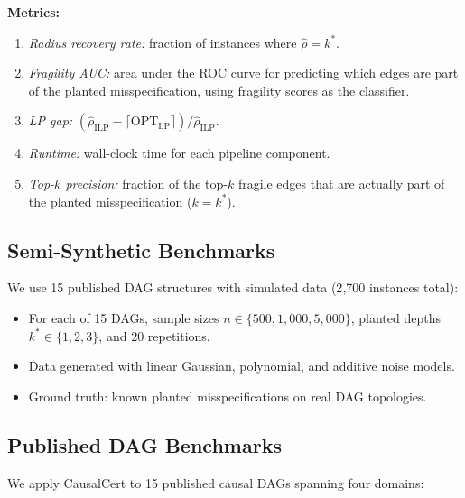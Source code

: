 \documentclass[11pt,a4paper]{article}
\theoremstyle{definition}
\theoremstyle{remark}
\newcommand{\radius}{\rho}
\begin{document}
\noindent\textbf{Metrics:}
\begin{enumerate}[label=(\alph*)]
  \item \textit{Radius recovery rate:} fraction of instances where $\hat\radius = k^*$.
  \item \textit{Fragility AUC:} area under the ROC curve for predicting which edges
    are part of the planted misspecification, using fragility scores as the classifier.
  \item \textit{LP gap:} $(\hat\radius_{\mathrm{ILP}} - \lceil\mathrm{OPT}_{\mathrm{LP}}\rceil) / \hat\radius_{\mathrm{ILP}}$.
  \item \textit{Runtime:} wall-clock time for each pipeline component.
  \item \textit{Top-$k$ precision:} fraction of the top-$k$ fragile edges that are
    actually part of the planted misspecification ($k = k^*$).
\end{enumerate}

\subsection{Semi-Synthetic Benchmarks}

We use 15 published DAG structures with simulated data (2{,}700 instances total):
\begin{itemize}
  \item For each of 15 DAGs, sample sizes $n \in \{500, 1{,}000, 5{,}000\}$,
    planted depths $k^* \in \{1, 2, 3\}$, and 20 repetitions.
  \item Data generated with linear Gaussian, polynomial, and additive noise models.
  \item Ground truth: known planted misspecifications on real DAG topologies.
\end{itemize}

\subsection{Published DAG Benchmarks}

We apply CausalCert to 15 published causal DAGs spanning four domains:
\end{document}
